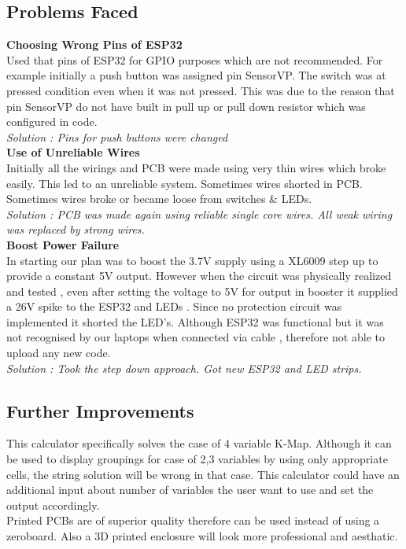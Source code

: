\documentclass[12pt,a4paper]{article}
\begin{document}
\subsection{Problems Faced}
\textbf{Choosing Wrong Pins of ESP32}\\
Used that pins of ESP32 for GPIO purposes which are not recommended. For example initially a push button was assigned pin SensorVP. The switch was at pressed condition even when it was not pressed. This was due to the reason that pin SensorVP do not have built in pull up or pull down resistor which was configured in code.\\
\textit{Solution : Pins for push buttons were changed}\\

\textbf{Use of Unreliable Wires}\\
Initially all the wirings and PCB were made using very thin wires which broke easily. This led to  an unreliable system. Sometimes wires shorted in PCB. Sometimes wires broke or became loose from switches \& LEDs. \\
\textit{Solution : PCB was made again using reliable single core wires. All weak wiring was replaced by strong wires.}\\

\textbf{Boost Power Failure }\\
In starting our plan was to boost the 3.7V supply using a XL6009 step up to provide a constant 5V output. However when the circuit was physically realized and tested , even after setting the voltage to 5V for output in booster it supplied a 26V spike to the ESP32 and LEDs . Since no protection circuit was implemented it shorted the LED’s. Although ESP32 was functional but it was not recognised by our laptops when connected via cable , therefore not able to upload any new code.\\
\textit{Solution : Took the step down approach. Got new ESP32 and LED strips.}
\subsection{Further Improvements}
This calculator specifically solves the case of 4 variable K-Map. Although it can be used to display groupings for case of 2,3 variables by using only appropriate cells, the string solution will be wrong in that case. This calculator could have an additional input about number of variables the user want to use and set the output accordingly. \\
Printed PCBs are of superior quality therefore can be used instead of using a zeroboard. Also a 3D printed enclosure will look more professional and aesthatic.
\end{document}

